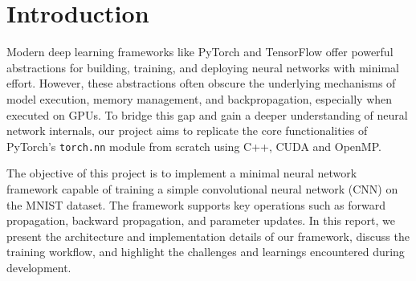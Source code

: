 \section{Introduction}

Modern deep learning frameworks like PyTorch and TensorFlow offer powerful abstractions for building, training, and deploying neural networks with minimal effort. However, these abstractions often obscure the underlying mechanisms of model execution, memory management, and backpropagation, especially when executed on GPUs. To bridge this gap and gain a deeper understanding of neural network internals, our project aims to replicate the core functionalities of PyTorch's \verb|torch.nn| module from scratch using C++, CUDA and OpenMP.

The objective of this project is to implement a minimal neural network framework capable of training a simple convolutional neural network (CNN) on the MNIST dataset. The framework supports key operations such as forward propagation, backward propagation, and parameter updates. In this report, we present the architecture and implementation details of our framework, discuss the training workflow, and highlight the challenges and learnings encountered during development.

